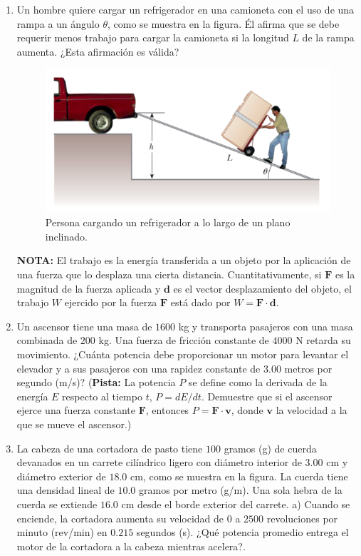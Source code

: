\documentclass{article}
\begin{document}
\begin{enumerate}

\item Un hombre quiere cargar un refrigerador en una camioneta con el uso de una rampa a un ángulo $\theta$, como se muestra en la figura. Él afirma que se debe requerir menos trabajo para cargar la camioneta si la longitud $L$ de la rampa aumenta. ¿Esta afirmación es válida?


\begin{figure}[H]
\centering
\includegraphics[scale=0.5]{problema_8.png}
\caption{Persona cargando un refrigerador a lo largo de un plano inclinado.}
\end{figure}


\textbf{NOTA:} El trabajo es la energía transferida a un objeto por la aplicación de una fuerza que lo desplaza una cierta distancia. Cuantitativamente, si $\textbf{F}$ es la magnitud de la fuerza aplicada y $\textbf{d}$ es el vector desplazamiento del objeto, el trabajo $W$ ejercido por la fuerza $\textbf{F}$ está dado por $W=\textbf{F}\cdot\textbf{d}$.

\item Un ascensor tiene una masa de $1600$ kg y transporta pasajeros con una masa combinada de $200$ kg. Una fuerza de fricción constante de $4000$ N retarda su movimiento. ¿Cuánta potencia debe proporcionar un motor para levantar el elevador y a sus pasajeros con una rapidez constante de $3$.$00$ metros por segundo (m/s)? (\textbf{Pista:} La potencia $P$ se define como la derivada de la energía $E$ respecto al tiempo $t$, $P=dE/dt$. Demuestre que si el ascensor ejerce una fuerza constante $\textbf{F}$, entonces $P=\textbf{F}\cdot \textbf{v}$, donde $\textbf{v}$ la velocidad a la que se mueve el ascensor.)

\item La cabeza de una cortadora de pasto tiene $100$ gramos (g) de cuerda devanados en un carrete cilíndrico ligero con diámetro interior de $3$.$00$ cm y diámetro exterior de $18$.$0$ cm, como se muestra en la figura. La cuerda tiene una densidad lineal de $10$.$0$ gramos por metro (g/m). Una sola hebra de la cuerda se extiende $16$.$0$ cm desde el borde exterior del carrete. a) Cuando se enciende, la cortadora aumenta su velocidad de $0$ a $2500$ revoluciones por minuto (rev/min) en $0$.$215$ segundos (s). ¿Qué potencia promedio entrega el motor de la cortadora a la cabeza mientras acelera?.


\end{enumerate}
\end{document}
